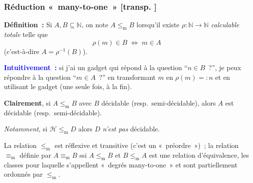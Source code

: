 \documentclass[mathserif,a4paper,aspectratio=169]{beamer}
\renewcommand{\frametitle}[1]{\subsubsection*{#1 {\footnotesize[transp. \insertframenumber]}}}
\begin{document}
\begin{frame}
\frametitle{Réduction « many-to-one »}

\textbf{Définition :} Si $A,B\subseteq\mathbb{N}$, on note $A
\mathrel{\leq_\mathrm{m}} B$ lorsqu'il existe $\rho \colon \mathbb{N}
\to \mathbb{N}$ \emph{calculable totale} telle que
\[
\rho(m) \in B \;\Longleftrightarrow\; m \in A
\]
{\footnotesize (c'est-à-dire $A = \rho^{-1}(B)$)}.

\bigskip

\textcolor{blue}{\textbf{Intuitivement :}} si j'ai un gadget qui
répond à la question “$n \in B$ ?”, je peux répondre à la question “$m
\in A$ ?” en transformant $m$ en $\rho(m) =: n$ et en utilisant le gadget
{\footnotesize (une seule fois, à la fin)}.

\bigskip

\textbf{Clairement}, si $A \mathrel{\leq_\mathrm{m}} B$ avec $B$
décidable (resp. semi-décidable), alors $A$ est décidable
(resp. semi-décidable).

\smallskip

\emph{Notamment}, si $\mathscr{H} \mathrel{\leq_\mathrm{m}} D$ alors
$D$ \emph{n'est pas} décidable.

\bigskip

{\footnotesize La relation $\mathrel{\leq_\mathrm{m}}$ est réflexive
  et transitive (c'est un « préordre ») ; la relation
  $\mathrel{\equiv_\mathrm{m}}$ définie par $A
  \mathrel{\equiv_\mathrm{m}} B$ ssi $A \mathrel{\leq_\mathrm{m}} B$
  et $B \mathrel{\leq_\mathrm{m}} A$ est une relation d'équivalence,
  les classes pour laquelle s'appellent « degrés many-to-one » et sont
  partiellement ordonnés par $\mathrel{\leq_\mathrm{m}}$.\par}

\end{frame}
%
\end{document}
